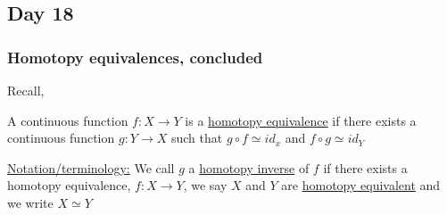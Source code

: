 \documentclass[../notes.tex]{subfiles}
\begin{document}
\subsection{Day 18}
\subsubsection{Homotopy equivalences, concluded}
Recall,
\begin{definition}
    A continuous function $f:X\rightarrow Y$ is a \underline{homotopy equivalence} if there exists
    a continuous function $g:Y\rightarrow X$ such that $g\circ f\simeq id_x$ and $f\circ g \simeq id_Y$\\

\end{definition}
    \underline{Notation/terminology:}
    We call $g$ a \underline{homotopy inverse} of $f$ if there exists a homotopy equivalence,
    $f:X\rightarrow Y$, we say $X$ and $Y$ are \underline{homotopy equivalent} and we write $X\simeq Y$
\end{document}
